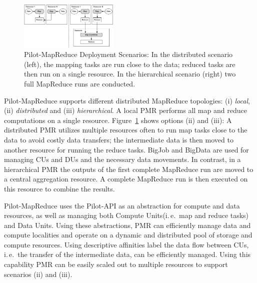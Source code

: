 \documentclass{sig-alternate}
\newcommand{\jhanote}[1]{ {\textcolor{red} { ***SJ: #1 }}}
\newcommand{\alnote}[1]{ {\textcolor{blue} { ***andreL: #1 }}}
\newcommand{\alnote}[1]{}
\newcommand{\jhanote}[1]{}
\newcommand{\upp}{\vspace*{-0.5em}}
\newcommand{\pilotmapreduce}{Pilot-MapReduce\xspace}
\newcommand{\computeunits}{Compute Units\xspace}
\newcommand{\dataunits}{Data Units\xspace}
\begin{document}
\begin{figure}
	\upp
	\centering
	\includegraphics[width=0.42\textwidth]{figures/distributed_hierachical.pdf}
	\caption{\pilotmapreduce Deployment Scenarios: In the
          distributed scenario (left), the mapping tasks are run close
          to the data; reduced tasks are then run on a single
          resource. In the hierarchical scenario (right) two full
          MapReduce runs are
          conducted. \label{fid:distributed-mapreduce-overview}\upp\upp}
\end{figure}


\pilotmapreduce supports different distributed MapReduce topologies:
(i) \emph{local}, (ii) \emph{distributed} and (iii)
\emph{hierarchical}. A local PMR performs all map and reduce
computations on a single resource.
Figure~\ref{fid:distributed-mapreduce-overview} shows options (ii) and
(iii): A distributed PMR utilizes multiple resources often to run map
tasks close to the data to avoid costly data transfers; the
intermediate data is then moved to another resource for running the
reduce tasks. BigJob and BigData are used for managing CUs and DUs and
the necessary data movements. In contrast, in a hierarchical PMR the
outputs of the first complete MapReduce run are moved to a central
aggregation resource. A complete MapReduce run is then executed on
this resource to combine the results. %


\pilotmapreduce uses the Pilot-API as an abstraction for compute and data
resources, as well as managing both \computeunits (i.\,e.\ map and reduce tasks)
and \dataunits. Using these abstractions, PMR can efficiently manage data and
compute localities and operate on a dynamic and distributed pool of storage and
compute resources. Using descriptive affinities label the data flow between CUs,
i.\,e.\ the transfer of the intermediate data, can be efficiently managed. Using
this capability PMR can be easily scaled out to multiple resources to support
scenarios (ii) and (iii).
\end{document}
